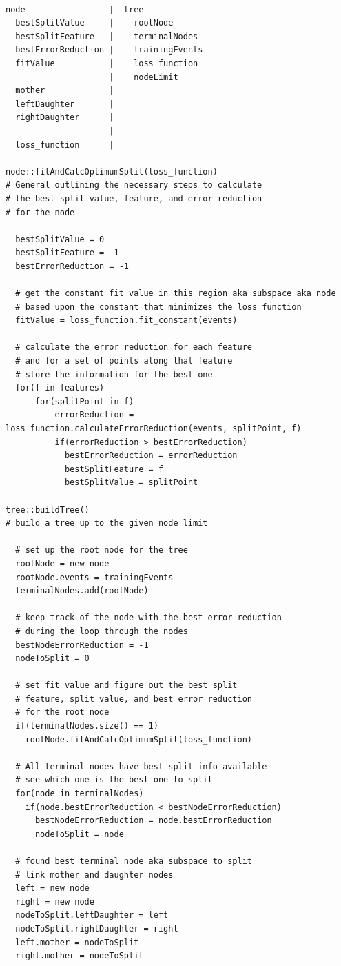 \documentclass[12pt]{article}
\begin{document}
\begin{verbatim}

node                 |  tree
  bestSplitValue     |    rootNode
  bestSplitFeature   |    terminalNodes
  bestErrorReduction |    trainingEvents
  fitValue           |    loss_function
                     |    nodeLimit
  mother             |    
  leftDaughter       |
  rightDaughter      |
                     |
  loss_function      |

node::fitAndCalcOptimumSplit(loss_function)
# General outlining the necessary steps to calculate
# the best split value, feature, and error reduction
# for the node

  bestSplitValue = 0
  bestSplitFeature = -1
  bestErrorReduction = -1

  # get the constant fit value in this region aka subspace aka node
  # based upon the constant that minimizes the loss function
  fitValue = loss_function.fit_constant(events)

  # calculate the error reduction for each feature
  # and for a set of points along that feature
  # store the information for the best one
  for(f in features)
      for(splitPoint in f)
          errorReduction = loss_function.calculateErrorReduction(events, splitPoint, f)
          if(errorReduction > bestErrorReduction)
            bestErrorReduction = errorReduction
            bestSplitFeature = f
            bestSplitValue = splitPoint

tree::buildTree()
# build a tree up to the given node limit

  # set up the root node for the tree
  rootNode = new node
  rootNode.events = trainingEvents
  terminalNodes.add(rootNode)

  # keep track of the node with the best error reduction
  # during the loop through the nodes
  bestNodeErrorReduction = -1
  nodeToSplit = 0

  # set fit value and figure out the best split
  # feature, split value, and best error reduction
  # for the root node
  if(terminalNodes.size() == 1)
    rootNode.fitAndCalcOptimumSplit(loss_function)

  # All terminal nodes have best split info available
  # see which one is the best one to split
  for(node in terminalNodes)
    if(node.bestErrorReduction < bestNodeErrorReduction)
      bestNodeErrorReduction = node.bestErrorReduction
      nodeToSplit = node

  # found best terminal node aka subspace to split
  # link mother and daughter nodes
  left = new node
  right = new node
  nodeToSplit.leftDaughter = left
  nodeToSplit.rightDaughter = right
  left.mother = nodeToSplit
  right.mother = nodeToSplit


\end{verbatim}
\end{document}
